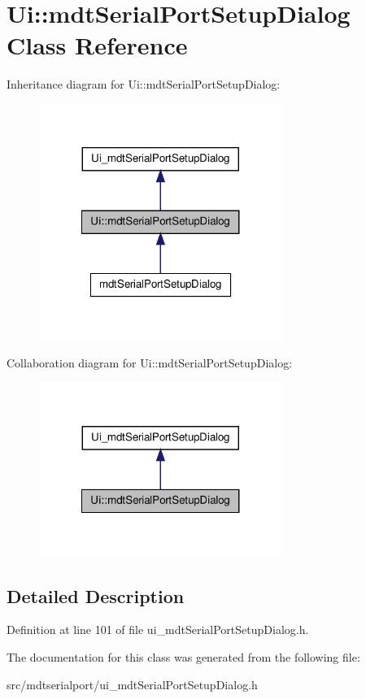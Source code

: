\hypertarget{class_ui_1_1mdt_serial_port_setup_dialog}{
\section{Ui::mdtSerialPortSetupDialog Class Reference}
\label{class_ui_1_1mdt_serial_port_setup_dialog}
}


Inheritance diagram for Ui::mdtSerialPortSetupDialog:\nopagebreak
\begin{figure}[H]
\begin{center}
\leavevmode
\includegraphics[width=224pt]{class_ui_1_1mdt_serial_port_setup_dialog__inherit__graph}
\end{center}
\end{figure}


Collaboration diagram for Ui::mdtSerialPortSetupDialog:\nopagebreak
\begin{figure}[H]
\begin{center}
\leavevmode
\includegraphics[width=224pt]{class_ui_1_1mdt_serial_port_setup_dialog__coll__graph}
\end{center}
\end{figure}


\subsection{Detailed Description}


Definition at line 101 of file ui\_\-mdtSerialPortSetupDialog.h.



The documentation for this class was generated from the following file:\begin{DoxyCompactItemize}
\item 
src/mdtserialport/ui\_\-mdtSerialPortSetupDialog.h\end{DoxyCompactItemize}
